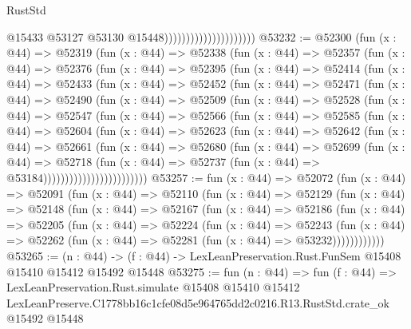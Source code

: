\begin{lexlean}{RustStd}
\begin{coremodule}
                                              @15433
                                              @53127
                                              @53130
                                              @15448)))))))))))))))))))))
@53232 := @52300
    (fun (x : @44) =>
    @52319
      (fun (x : @44) =>
      @52338
        (fun (x : @44) =>
        @52357
          (fun (x : @44) =>
          @52376
            (fun (x : @44) =>
            @52395
              (fun (x : @44) =>
              @52414
                (fun (x : @44) =>
                @52433
                  (fun (x : @44) =>
                  @52452
                    (fun (x : @44) =>
                    @52471
                      (fun (x : @44) =>
                      @52490
                        (fun (x : @44) =>
                        @52509
                          (fun (x : @44) =>
                          @52528
                            (fun (x : @44) =>
                            @52547
                              (fun (x : @44) =>
                              @52566
                                (fun (x : @44) =>
                                @52585
                                  (fun (x : @44) =>
                                  @52604
                                    (fun (x : @44) =>
                                    @52623
                                      (fun (x : @44) =>
                                      @52642
                                        (fun (x : @44) =>
                                        @52661
                                          (fun (x : @44) =>
                                          @52680
                                            (fun (x : @44) =>
                                            @52699
                                              (fun (x : @44) =>
                                              @52718
                                                (fun (x : @44) =>
                                                @52737
                                                  (fun (x : @44) => @53184))))))))))))))))))))))))
@53257 := fun (x : @44) =>
  @52072
    (fun (x : @44) =>
    @52091
      (fun (x : @44) =>
      @52110
        (fun (x : @44) =>
        @52129
          (fun (x : @44) =>
          @52148
            (fun (x : @44) =>
            @52167
              (fun (x : @44) =>
              @52186
                (fun (x : @44) =>
                @52205
                  (fun (x : @44) =>
                  @52224
                    (fun (x : @44) =>
                    @52243
                      (fun (x : @44) =>
                      @52262 (fun (x : @44) => @52281 (fun (x : @44) => @53232))))))))))))
@53265 := (n : @44) ->
  (f : @44) -> LexLeanPreservation.Rust.FunSem @15408 @15410 @15412 @15492 @15448
@53275 := fun (n : @44) =>
  fun (f : @44) =>
  LexLeanPreservation.Rust.simulate
    @15408
    @15410
    @15412
    LexLeanPreserve.C1778bb16c1cfe08d5e964765dd2c0216.R13.RustStd.crate_ok
    @15492
    @15448
\end{coremodule}
\end{lexlean}
